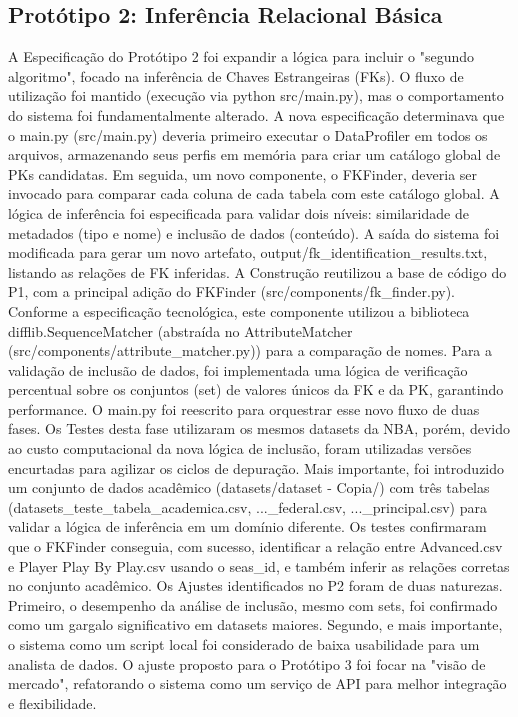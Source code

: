 \documentclass[12pt, a4paper]{article}
\begin{document}
\subsection{Protótipo 2: Inferência Relacional Básica} 
\label{subsec:prototipo2}

A Especificação do Protótipo 2 foi expandir a lógica para incluir o "segundo algoritmo", focado na inferência de Chaves Estrangeiras (FKs). 
O fluxo de utilização foi mantido (execução via python src/main.py), mas o comportamento do sistema foi fundamentalmente alterado. 
A nova especificação determinava que o main.py (src/main.py) deveria primeiro executar o DataProfiler em todos os arquivos, armazenando seus perfis em memória para criar um catálogo global de PKs candidatas. 
Em seguida, um novo componente, o FKFinder, deveria ser invocado para comparar cada coluna de cada tabela com este catálogo global. 
A lógica de inferência foi especificada para validar dois níveis: similaridade de metadados (tipo e nome) e inclusão de dados (conteúdo).
A saída do sistema foi modificada para gerar um novo artefato, output/fk\_identification\_results.txt, listando as relações de FK inferidas. 
A Construção reutilizou a base de código do P1, com a principal adição do FKFinder (src/components/fk\_finder.py). 
Conforme a especificação tecnológica, este componente utilizou a biblioteca difflib.SequenceMatcher (abstraída no AttributeMatcher (src/components/attribute\_matcher.py)) para a comparação de nomes. 
Para a validação de inclusão de dados, foi implementada uma lógica de verificação percentual sobre os conjuntos (set) de valores únicos da FK e da PK, garantindo performance. 
O main.py foi reescrito para orquestrar esse novo fluxo de duas fases. 
Os Testes desta fase utilizaram os mesmos datasets da NBA, porém, devido ao custo computacional da nova lógica de inclusão, foram utilizadas versões encurtadas para agilizar os ciclos de depuração. 
Mais importante, foi introduzido um conjunto de dados acadêmico (datasets/dataset - Copia/) com três tabelas (datasets\_teste\_tabela\_academica.csv, ...\_federal.csv, ...\_principal.csv) para validar a lógica de inferência em um domínio diferente.
Os testes confirmaram que o FKFinder conseguia, com sucesso, identificar a relação entre Advanced.csv e Player Play By Play.csv usando o seas\_id, e também inferir as relações corretas no conjunto acadêmico.
Os Ajustes identificados no P2 foram de duas naturezas. Primeiro, o desempenho da análise de inclusão, mesmo com sets, foi confirmado como um gargalo significativo em datasets maiores. 
Segundo, e mais importante, o sistema como um script local foi considerado de baixa usabilidade para um analista de dados.
O ajuste proposto para o Protótipo 3 foi focar na "visão de mercado", refatorando o sistema como um serviço de API para melhor integração e flexibilidade.
\end{document}
